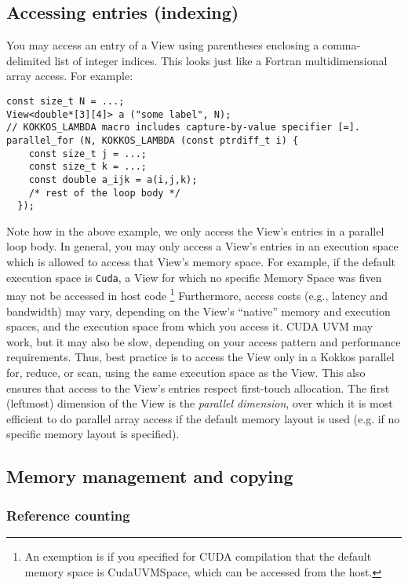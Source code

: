 \subsection{Accessing entries (indexing)}

You may access an entry of a View using parentheses enclosing a
comma-delimited list of integer indices.  This looks just like a
Fortran multidimensional array access.  For example:
\begin{lstlisting}
const size_t N = ...;
View<double*[3][4]> a ("some label", N);
// KOKKOS_LAMBDA macro includes capture-by-value specifier [=].
parallel_for (N, KOKKOS_LAMBDA (const ptrdiff_t i) {
    const size_t j = ...;
    const size_t k = ...;
    const double a_ijk = a(i,j,k);
    /* rest of the loop body */
  });
\end{lstlisting}
Note how in the above example, we only access the View's entries in a
parallel loop body.  In general, you may only access a View's entries
in an execution space which is allowed to access that View's memory
space.  For example, if the default execution space is \lstinline!Cuda!, 
a View for which no specific Memory Space was fiven may not be accessed 
in host code \footnote{An exemption is if you specified for CUDA compilation
that the default memory space is CudaUVMSpace, which can be accessed from 
the host.}
Furthermore, access costs (e.g., latency and
bandwidth) may vary, depending on the View's ``native'' memory and
execution spaces, and the execution space from which you access it.
CUDA UVM may work, but it may also be slow, depending on your access
pattern and performance requirements.  Thus, best practice is to
access the View only in a Kokkos parallel for, reduce, or scan, using
the same execution space as the View.  This also ensures that access
to the View's entries respect first-touch allocation.  The first
(leftmost) dimension of the View is the \emph{parallel dimension},
over which it is most efficient to do parallel array access if the 
default memory layout is used (e.g. if no specific memory layout is 
specified).

\subsection{Memory management and copying}

\subsubsection{Reference counting}

